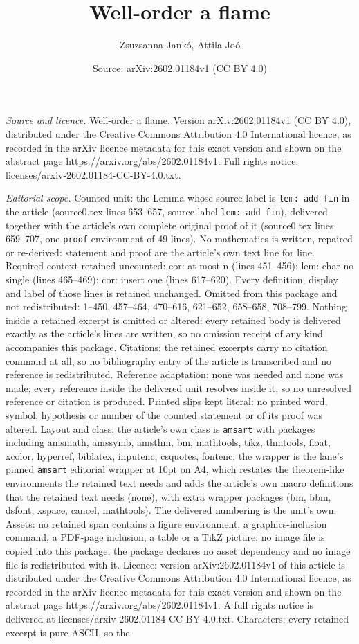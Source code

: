 \documentclass[10pt,a4paper]{amsart}
\title[Well-order a flame]{Well-order a flame}
\author{Zsuzsanna Jank\'o, Attila Jo\'o}
\date{Source: arXiv:2602.01184v1 (CC BY 4.0)}
\begin{document}
\maketitle

\noindent\emph{Source and licence.} Well-order a flame. Version arXiv:2602.01184v1 (CC BY 4.0), distributed under the Creative Commons Attribution 4.0 International licence, as recorded in the arXiv licence metadata for this exact version and shown on the abstract page https://arxiv.org/abs/2602.01184v1. Full rights notice: licenses/arxiv-2602.01184-CC-BY-4.0.txt.\par\smallskip

\noindent\textit{Editorial scope.} Counted unit: the Lemma whose source label is \texttt{lem: add fin} in the article (source0.tex lines 653--657, source label \texttt{lem: add fin}), delivered together with the article's own complete original proof of it (source0.tex lines 659--707, one \texttt{proof} environment of 49 lines). No mathematics is written, repaired or re-derived: statement and proof are the article's own text line for line. Required context retained uncounted: cor: at most n (lines 451--456); lem: char no single (lines 465--469); cor: insert one (lines 617--620). Every definition, display and label of those lines is retained unchanged. Omitted from this package and not redistributed: 1--450, 457--464, 470--616, 621--652, 658--658, 708--799. Nothing inside a retained excerpt is omitted or altered: every retained body is delivered exactly as the article's lines are written, so no omission receipt of any kind accompanies this package. Citations: the retained excerpts carry no citation command at all, so no bibliography entry of the article is transcribed and no reference is redistributed. Reference adaptation: none was needed and none was made; every reference inside the delivered unit resolves inside it, so no unresolved reference or citation is produced. Printed slips kept literal: no printed word, symbol, hypothesis or number of the counted statement or of its proof was altered. Layout and class: the article's own class is \texttt{amsart} with packages including amsmath, amssymb, amsthm, bm, mathtools, tikz, thmtools, float, xcolor, hyperref, biblatex, inputenc, csquotes, fontenc; the wrapper is the lane's pinned \texttt{amsart} editorial wrapper at 10pt on A4, which restates the theorem-like environments the retained text needs and adds the article's own macro definitions that the retained text needs (none), with extra wrapper packages (bm, bbm, dsfont, xspace, cancel, mathtools). The delivered numbering is the unit's own. Assets: no retained span contains a figure environment, a graphics-inclusion command, a PDF-page inclusion, a table or a TikZ picture; no image file is copied into this package, the package declares no asset dependency and no image file is redistributed with it. Licence: version arXiv:2602.01184v1 of this article is distributed under the Creative Commons Attribution 4.0 International licence, as recorded in the arXiv licence metadata for this exact version and shown on the abstract page https://arxiv.org/abs/2602.01184v1. A full rights notice is delivered at licenses/arxiv-2602.01184-CC-BY-4.0.txt. Characters: every retained excerpt is pure ASCII, so the 
\end{document}
